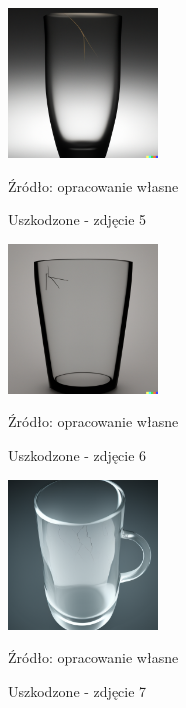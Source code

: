 \begin{figure}[htbp]
  \centering
  \caption{Uszkodzone - zdjęcie 5}
  \includegraphics[width=150px]{images/failure_5.png}
  \begin{center}
  \footnotesize{Źródło: opracowanie własne}
  \end{center}
  \label{fig:zdjecie_uszkodzone_5}
\end{figure}

\begin{figure}[htbp]
  \centering
  \caption{Uszkodzone - zdjęcie 6}
  \includegraphics[width=150px]{images/failure_6.png}
  \begin{center}
  \footnotesize{Źródło: opracowanie własne}
  \end{center}
  \label{fig:zdjecie_uszkodzone_6}
\end{figure}

\begin{figure}[htbp]
  \centering
  \caption{Uszkodzone - zdjęcie 7}
  \includegraphics[width=150px]{images/failure_7.png}
  \begin{center}
  \footnotesize{Źródło: opracowanie własne}
  \end{center}
  \label{fig:zdjecie_uszkodzone_7}
\end{figure}

